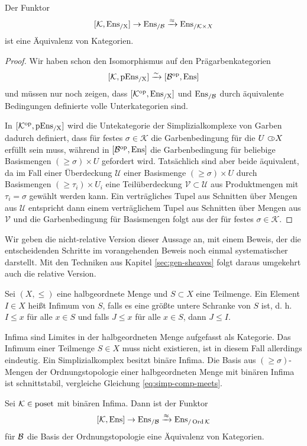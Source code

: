\begin{satz} \label{simp-comp-sheaf}
  Der Funktor
  \[
  [\mathcal{K}, \operatorname{Ens_{/X}}] \to \operatorname{Ens_{/\mathcal{B}}} \xrightarrow{\approx} \operatorname{Ens}_{/\mathcal{K} \times X}
  \]
  ist eine Äquivalenz von Kategorien.
\end{satz}
\begin{proof}
  Wir haben schon den Isomorphismus auf den Prägarbenkategorien
  \[ [\mathcal{K}, \operatorname{pEns_{/X}}] \xrightarrow[]{\sim} {[\mathcal{B}^\mathrm{op}, \operatorname{Ens}]} \]
  und müssen nur noch zeigen, dass $[\mathcal{K}^\mathrm{op}, \operatorname{Ens_{/X}}]$ und
  $\operatorname{Ens_{/\mathcal{B}}}$ durch äquivalente Bedingungen definierte volle
  Unterkategorien sind.

  In $[\mathcal{K}^\mathrm{op}, \operatorname{pEns_{/X}}]$ wird die Untekategorie der
  Simplizialkomplexe von Garben dadurch definiert, dass für festes
  $\sigma \in \mathcal{K}$ die Garbenbedingung für die $U \subset\kern-0.58em\circ X$
  erfüllt sein muss, während in $[\mathcal{B}^\mathrm{op}, \operatorname{Ens}]$ die Garbenbedingung
  für beliebige Basismengen $(\geq \sigma) \times U$ gefordert
  wird. Tatsächlich sind aber beide äquivalent, da im Fall einer
  Überdeckung $\mathcal{U}$ einer Basismenge $(\geq \sigma) \times U$
  durch Basismengen $(\geq \tau_i) \times U_i$ eine Teilüberdeckung
  $\mathcal{V} \subset \mathcal{U}$ aus Produktmengen mit $\tau_i =
  \sigma$ gewählt werden kann. Ein verträgliches Tupel aus Schnitten
  über Mengen aus $\mathcal{U}$ entspricht dann einem verträglichem
  Tupel aus Schnitten über Mengen aus $\mathcal{V}$ und die
  Garbenbedingung für Basismengen folgt aus der für festes
  $\sigma \in \mathcal{K}$.
\end{proof}
Wir geben die nicht-relative Version dieser Aussage an, mit einem
Beweis, der die entscheidenden Schritte im vorangehenden Beweis noch
einmal systematischer darstellt. Mit den Techniken aus Kapitel
\ref{sec:gen-sheaves} folgt daraus umgekehrt auch die relative
Version.
\begin{defn}
  Sei $(X, \leq)$ eine halbgeordnete Menge und $S \subset X$ eine
  Teilmenge. Ein Element $I \in X$ heißt Infimum von $S$, falls es
  eine größte untere Schranke von $S$ ist, d. h. $I \leq x$ für alle
  $x \in S$ und falls $J \leq x$ für alle $x \in S$, dann $J \leq I$.
\end{defn}
Infima sind Limites in der halbgeordneten Menge aufgefasst als
Kategorie. Das Infimum einer Teilmenge $S \in X$ muss nicht
existieren, ist in diesem Fall allerdings eindeutig. Ein
Simplizialkomplex besitzt binäre Infima. Die Basis aus $(\geq
\sigma)$-Mengen der Ordnungstopologie einer halbgeordneten Menge mit
binären Infima ist schnittstabil, vergleiche Gleichung
\ref{eq:simp-comp-meets}.
\begin{satz} \label{sheaf-order-top}
  Sei $\mathcal{K} \in \operatorname{poset}$ mit binären Infima. Dann ist der Funktor
  \[
  [\mathcal{K}, \operatorname{Ens}] \to \operatorname{Ens_{/\mathcal{B}}} \xrightarrow{\approx} \operatorname{Ens}_{/\operatorname{Ord} \mathcal{K}}
  \]
  für $\mathcal{B}$ die Basis der Ordnungstopologie eine Äquivalenz von
  Kategorien.
\end{satz}
